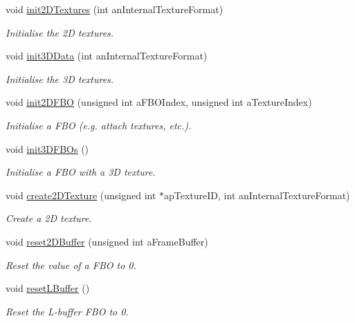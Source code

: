 \begin{DoxyCompactItemize}
void \hyperlink{classg_virtual_x_ray_1_1_x_ray_renderer_a7426f1da160716ac5a07ce77bef11d88}{init2DTextures} (int anInternalTextureFormat)
\begin{DoxyCompactList}\small\item\em Initialise the 2D textures. \end{DoxyCompactList}\item 
void \hyperlink{classg_virtual_x_ray_1_1_x_ray_renderer_ae19e22db29248abc1697891358ddf4ef}{init3DData} (int anInternalTextureFormat)
\begin{DoxyCompactList}\small\item\em Initialise the 3D textures. \end{DoxyCompactList}\item 
void \hyperlink{classg_virtual_x_ray_1_1_x_ray_renderer_ad0c1f3e117c0a473f7a27b760be8406b}{init2DFBO} (unsigned int aFBOIndex, unsigned int aTextureIndex)
\begin{DoxyCompactList}\small\item\em Initialise a FBO (e.g. attach textures, etc.). \end{DoxyCompactList}\item 
void \hyperlink{classg_virtual_x_ray_1_1_x_ray_renderer_a1e858d82bd7df2f02f98ce1fa700b352}{init3DFBOs} ()
\begin{DoxyCompactList}\small\item\em Initialise a FBO with a 3D texture. \end{DoxyCompactList}\item 
void \hyperlink{classg_virtual_x_ray_1_1_x_ray_renderer_ae3a251145da088ff95dd299eb5394405}{create2DTexture} (unsigned int $\ast$apTextureID, int anInternalTextureFormat)
\begin{DoxyCompactList}\small\item\em Create a 2D texture. \end{DoxyCompactList}\item 
void \hyperlink{classg_virtual_x_ray_1_1_x_ray_renderer_a9aceef4f519760a2694b0b19fe634996}{reset2DBuffer} (unsigned int aFrameBuffer)
\begin{DoxyCompactList}\small\item\em Reset the value of a FBO to 0. \end{DoxyCompactList}\item 
void \hyperlink{classg_virtual_x_ray_1_1_x_ray_renderer_a6c875c895dc36457d367b7553a2c8e9c}{resetLBuffer} ()
\begin{DoxyCompactList}\small\item\em Reset the L-\/buffer FBO to 0. \end{DoxyCompactList}\item 

\end{DoxyCompactItemize}
